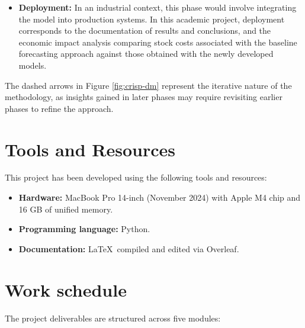 \documentclass[ENG]{TFUOC}%
\begin{document}
\begin{itemize}
    \item \textbf{Deployment:} In an industrial context, this 
    phase would involve integrating the model into production 
    systems. In this academic project, deployment corresponds to 
    the documentation of results and conclusions, and the 
    economic impact analysis comparing stock costs associated 
    with the baseline forecasting approach against those obtained 
    with the newly developed models.
\end{itemize}

The dashed arrows in Figure \ref{fig:crisp-dm} represent the iterative nature of the methodology, as insights gained in later phases may require revisiting earlier phases to refine the approach.


\section{Tools and Resources}

This project has been developed using the following tools and resources:

\begin{itemize}
    \item \textbf{Hardware:} MacBook Pro 14-inch (November 2024) 
    with Apple M4 chip and 16 GB of unified memory.

    \item \textbf{Programming language:} Python.


    \item \textbf{Documentation:} \LaTeX\, compiled and edited via Overleaf.
\end{itemize}




\section{Work schedule}

The project deliverables are structured across five modules:
\end{document}
